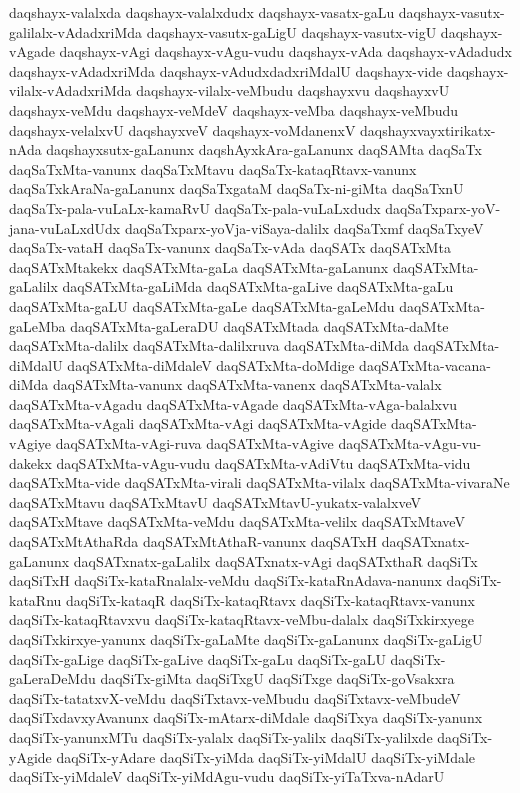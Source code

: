 {daqshayx-valalxda
daqshayx-valalxdudx
daqshayx-vasatx-gaLu
daqshayx-vasutx-galilalx-vAdadxriMda
daqshayx-vasutx-gaLigU
daqshayx-vasutx-vigU
daqshayx-vAgade
daqshayx-vAgi
daqshayx-vAgu-vudu
daqshayx-vAda
daqshayx-vAdadudx
daqshayx-vAdadxriMda
daqshayx-vAdudxdadxriMdalU
daqshayx-vide
daqshayx-vilalx-vAdadxriMda
daqshayx-vilalx-veMbudu
daqshayxvu
daqshayxvU
daqshayx-veMdu
daqshayx-veMdeV
daqshayx-veMba
daqshayx-veMbudu
daqshayx-velalxvU
daqshayxveV
daqshayx-voMdanenxV
daqshayxvayxtirikatx-nAda
daqshayxsutx-gaLanunx
daqshAyxkAra-gaLanunx
daqSAMta
daqSaTx
daqSaTxMta-vanunx
daqSaTxMtavu
daqSaTx-kataqRtavx-vanunx
daqSaTxkAraNa-gaLanunx
daqSaTxgataM
daqSaTx-ni-giMta
daqSaTxnU
daqSaTx-pala-vuLaLx-kamaRvU
daqSaTx-pala-vuLaLxdudx
daqSaTxparx-yoV-jana-vuLaLxdUdx
daqSaTxparx-yoVja-viSaya-dalilx
daqSaTxmf
daqSaTxyeV
daqSaTx-vataH
daqSaTx-vanunx
daqSaTx-vAda
daqSATx
daqSATxMta
daqSATxMtakekx
daqSATxMta-gaLa
daqSATxMta-gaLanunx
daqSATxMta-gaLalilx
daqSATxMta-gaLiMda
daqSATxMta-gaLive
daqSATxMta-gaLu
daqSATxMta-gaLU
daqSATxMta-gaLe
daqSATxMta-gaLeMdu
daqSATxMta-gaLeMba
daqSATxMta-gaLeraDU
daqSATxMtada
daqSATxMta-daMte
daqSATxMta-dalilx
daqSATxMta-dalilxruva
daqSATxMta-diMda
daqSATxMta-diMdalU
daqSATxMta-diMdaleV
daqSATxMta-doMdige
daqSATxMta-vacana-diMda
daqSATxMta-vanunx
daqSATxMta-vanenx
daqSATxMta-valalx
daqSATxMta-vAgadu
daqSATxMta-vAgade
daqSATxMta-vAga-balalxvu
daqSATxMta-vAgali
daqSATxMta-vAgi
daqSATxMta-vAgide
daqSATxMta-vAgiye
daqSATxMta-vAgi-ruva
daqSATxMta-vAgive
daqSATxMta-vAgu-vu-dakekx
daqSATxMta-vAgu-vudu
daqSATxMta-vAdiVtu
daqSATxMta-vidu
daqSATxMta-vide
daqSATxMta-virali
daqSATxMta-vilalx
daqSATxMta-vivaraNe
daqSATxMtavu
daqSATxMtavU
daqSATxMtavU-yukatx-valalxveV
daqSATxMtave
daqSATxMta-veMdu
daqSATxMta-velilx
daqSATxMtaveV
daqSATxMtAthaRda
daqSATxMtAthaR-vanunx
daqSATxH
daqSATxnatx-gaLanunx
daqSATxnatx-gaLalilx
daqSATxnatx-vAgi
daqSATxthaR
daqSiTx
daqSiTxH
daqSiTx-kataRnalalx-veMdu
daqSiTx-kataRnAdava-nanunx
daqSiTx-kataRnu
daqSiTx-kataqR
daqSiTx-kataqRtavx
daqSiTx-kataqRtavx-vanunx
daqSiTx-kataqRtavxvu
daqSiTx-kataqRtavx-veMbu-dalalx
daqSiTxkirxyege
daqSiTxkirxye-yanunx
daqSiTx-gaLaMte
daqSiTx-gaLanunx
daqSiTx-gaLigU
daqSiTx-gaLige
daqSiTx-gaLive
daqSiTx-gaLu
daqSiTx-gaLU
daqSiTx-gaLeraDeMdu
daqSiTx-giMta
daqSiTxgU
daqSiTxge
daqSiTx-goVsakxra
daqSiTx-tatatxvX-veMdu
daqSiTxtavx-veMbudu
daqSiTxtavx-veMbudeV
daqSiTxdavxyAvanunx
daqSiTx-mAtarx-diMdale
daqSiTxya
daqSiTx-yanunx
daqSiTx-yanunxMTu
daqSiTx-yalalx
daqSiTx-yalilx
daqSiTx-yalilxde
daqSiTx-yAgide
daqSiTx-yAdare
daqSiTx-yiMda
daqSiTx-yiMdalU
daqSiTx-yiMdale
daqSiTx-yiMdaleV
daqSiTx-yiMdAgu-vudu
daqSiTx-yiTaTxva-nAdarU
}
